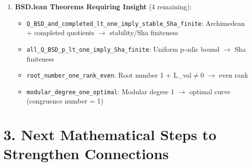 \documentclass[11pt]{article}
\begin{document}
\begin{enumerate}
\begin{itemize}
  \item \texttt{monopole\_condensation}: Monopole condensation $\rightarrow$ mass gap
  \item \texttt{spectral\_genus\_zero}: Spectral genus zero $\rightarrow$ mass gap
  \end{itemize}
\item \textbf{BSD.lean Theorems Requiring Insight} (4 remaining):
  \begin{itemize}
  \item \texttt{Q\_BSD\_and\_completed\_lt\_one\_imply\_stable\_Sha\_finite}: Archimedean + completed quotients $\rightarrow$ stability/Sha finiteness
  \item \texttt{all\_Q\_BSD\_p\_lt\_one\_imply\_Sha\_finite}: Uniform p-adic bound $\rightarrow$ Sha finiteness
  \item \texttt{root\_number\_one\_rank\_even}: Root number 1 + L\_val$\neq$0 $\rightarrow$ even rank
  \item \texttt{modular\_degree\_one\_optimal}: Modular degree 1 $\rightarrow$ optimal curve (congruence number = 1)
  \end{itemize}
\end{enumerate}

\section{3. Next Mathematical Steps to Strengthen Connections}
\end{document}
